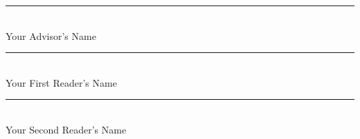 \documentclass[12pt, oneside]{book2}
\newcommand{\thesisAdvisor}{Your Advisor's Name}
\newcommand{\thesisFirstReader}{Your First Reader's Name}
\newcommand{\thesisSecondReader}{Your Second Reader's Name}
\begin{document}
\begin{titlepage}
\begin{center}
    \vspace{1.5cm}

    \rule[-0.1cm]{8cm}{0.01cm} \\
    \thesisAdvisor \\

    \vspace{1.0cm}

    \rule[-0.1cm]{8cm}{0.01cm} \\
    \thesisFirstReader \\

    \vspace{1.0cm}

    \rule[-0.1cm]{8cm}{0.01cm} \\
    \thesisSecondReader \\

\end{center}
\thispagestyle{empty}
\end{titlepage}

\singlespacing
\setcounter{page}{3}

\tableofcontents
\setcounter{tocdepth}{2}
\cleardoublepage

\listoftables
\cleardoublepage

\listoffigures

\newpage



\mainmatter










\appendix


\backmatter



\end{document}
